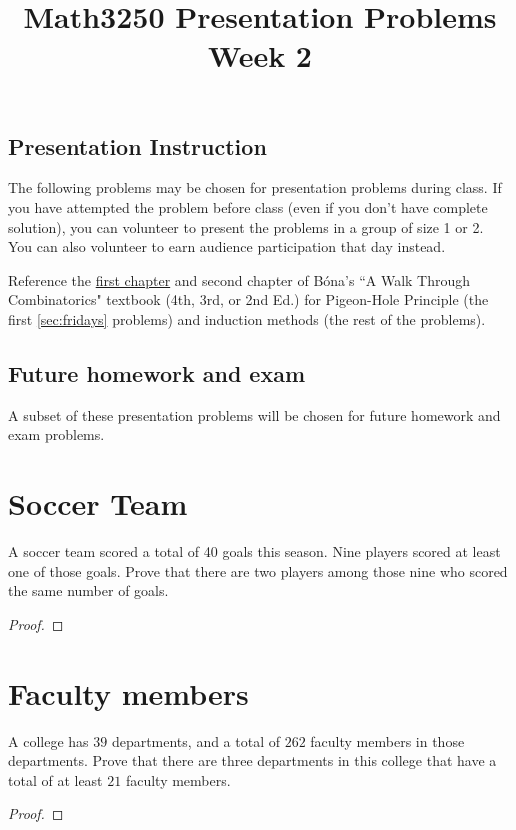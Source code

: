 \documentclass[10pt]{amsart}
\title{Math3250 Presentation Problems Week 2}
\begin{document}
\maketitle



\subsection*{Presentation Instruction}
The following problems may be chosen for presentation problems during class. 
If you have attempted the problem before class (even if you don't have complete solution), you can volunteer to present the problems in a group of size 1 or 2. 
You can also volunteer to earn audience participation that day instead. 


Reference the  \href{https://www.worldscientific.com/doi/pdf/10.1142/9789813148857_0001}{first chapter} and second chapter of  B\'ona's ``A Walk Through Combinatorics" textbook (4th, 3rd, or 2nd Ed.) for Pigeon-Hole Principle (the first \ref{sec:fridays} problems)  and induction methods (the rest of the problems).

\subsection*{Future homework and exam}
A subset of these presentation problems will be chosen for future homework and exam problems.

\bigskip



\section{Soccer Team} 
A soccer team scored a total of 40 goals this season. Nine players scored at least one of those goals. Prove that there are two players among those nine who scored the same number of goals.
\begin{proof}
\end{proof}



\section{Faculty members}
A college has $39$ departments, and a total of $262$ faculty members in those departments. Prove that there are three departments in this college that have a total of at least $21$ faculty members.
\begin{proof}
\end{proof}
\end{document}
